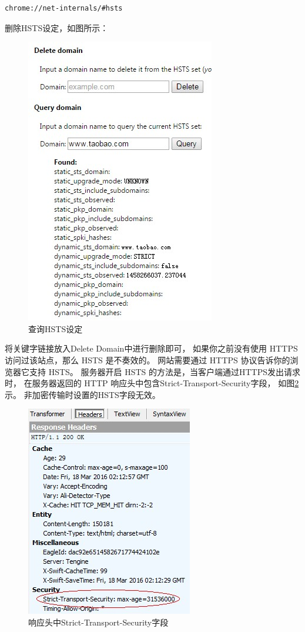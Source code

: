 \documentclass{book}
\begin{document}
\begin{lstlisting}[language=HTML]
chrome://net-internals/#hsts
\end{lstlisting}

删除HSTS设定，如图所示：

\begin{figure}[htbp]
	\centering
	\includegraphics[scale=0.7]{DeleteChromeHSTSSetting.jpg}
	\caption{查询HSTS设定}
	\label{fig:DeleteChromeHSTSSetting}
\end{figure}

将关键字链接放入Delete Domain中进行删除即可，
如果你之前没有使用 HTTPS 访问过该站点，那么 HSTS 是不奏效的。
网站需要通过 HTTPS 协议告诉你的浏览器它支持 HSTS。
服务器开启 HSTS 的方法是，当客户端通过HTTPS发出请求时，
在服务器返回的 HTTP 响应头中包含Strict-Transport-Security字段，
如图\ref{fig:HSTSResponseHeaderSecurity}示。
非加密传输时设置的HSTS字段无效。

\begin{figure}[htbp]
	\centering
	\includegraphics[scale=0.7]{HSTSResponseHeaderSecurity.jpg}
	\caption{响应头中Strict-Transport-Security字段}
	\label{fig:HSTSResponseHeaderSecurity}
\end{figure}
\end{document}
